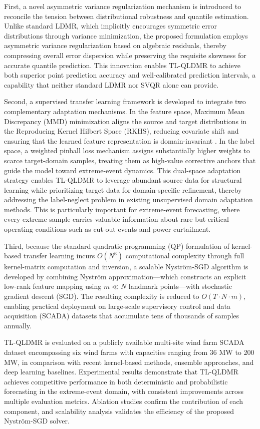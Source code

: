 \documentclass[a4paper]{cas-sc}
\begin{document}
First, a novel asymmetric variance regularization mechanism is introduced to reconcile the tension between distributional robustness and quantile estimation. Unlike standard LDMR, which implicitly encourages symmetric error distributions through variance minimization, the proposed formulation employs asymmetric variance regularization based on algebraic residuals, thereby compressing overall error dispersion while preserving the requisite skewness for accurate quantile prediction. This innovation enables TL-QLDMR to achieve both superior point prediction accuracy and well-calibrated prediction intervals, a capability that neither standard LDMR nor SVQR alone can provide.

Second, a supervised transfer learning framework is developed to integrate two complementary adaptation mechanisms. In the feature space, Maximum Mean Discrepancy (MMD) minimization aligns the source and target distributions in the Reproducing Kernel Hilbert Space (RKHS), reducing covariate shift and ensuring that the learned feature representation is domain-invariant \citep{TAO20123962}. In the label space, a weighted pinball loss mechanism assigns substantially higher weights to scarce target-domain samples, treating them as high-value corrective anchors that guide the model toward extreme-event dynamics. This dual-space adaptation strategy enables TL-QLDMR to leverage abundant source data for structural learning while prioritizing target data for domain-specific refinement, thereby addressing the label-neglect problem in existing unsupervised domain adaptation methods. This is particularly important for extreme-event forecasting, where every extreme sample carries valuable information about rare but critical operating conditions such as cut-out events and power curtailment.

Third, because the standard quadratic programming (QP) formulation of kernel-based transfer learning incurs $O(N^3)$ computational complexity through full kernel-matrix computation and inversion, a scalable Nystr\"{o}m-SGD algorithm is developed by combining Nystr\"{o}m approximation---which constructs an explicit low-rank feature mapping using $m \ll N$ landmark points---with stochastic gradient descent (SGD). The resulting complexity is reduced to $O(T \cdot N \cdot m)$, enabling practical deployment on large-scale supervisory control and data acquisition (SCADA) datasets \citep{s41597-022-01696-6} that accumulate tens of thousands of samples annually.

TL-QLDMR is evaluated on a publicly available multi-site wind farm SCADA dataset encompassing six wind farms with capacities ranging from 36 MW to 200 MW, in comparison with recent kernel-based methods, ensemble approaches, and deep learning baselines. Experimental results demonstrate that TL-QLDMR achieves competitive performance in both deterministic and probabilistic forecasting in the extreme-event domain, with consistent improvements across multiple evaluation metrics. Ablation studies confirm the contribution of each component, and scalability analysis validates the efficiency of the proposed Nystr\"{o}m-SGD solver.
\end{document}
